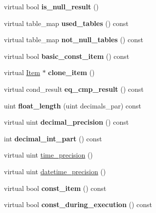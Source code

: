 \begin{DoxyCompactItemize}
virtual bool {\bfseries is\+\_\+null\+\_\+result} ()
\item 
\mbox{\label{classItem_a2e6f1d83258831b14cbbb9212dbd378f}} 
virtual table\+\_\+map {\bfseries used\+\_\+tables} () const
\item 
\mbox{\label{classItem_a91e91383b3287dc58a27a3bf73e13e29}} 
virtual table\+\_\+map {\bfseries not\+\_\+null\+\_\+tables} () const
\item 
\mbox{\label{classItem_ada4688a1a037bd0c37752a763efe350f}} 
virtual bool {\bfseries basic\+\_\+const\+\_\+item} () const
\item 
\mbox{\label{classItem_ad441e5a0412f3a464ccf0a75cd6ffd5c}} 
virtual \mbox{\hyperlink{classItem}{Item}} $\ast$ {\bfseries clone\+\_\+item} ()
\item 
\mbox{\label{classItem_aacb1156cd4d3dedc374e7464f07fef73}} 
virtual cond\+\_\+result {\bfseries eq\+\_\+cmp\+\_\+result} () const
\item 
\mbox{\label{classItem_a54a5915f10d0649231b9b7bfff87f29d}} 
uint {\bfseries float\+\_\+length} (uint decimals\+\_\+par) const
\item 
\mbox{\label{classItem_a48997bf065bfa474b8d791f066bceae7}} 
virtual uint {\bfseries decimal\+\_\+precision} () const
\item 
\mbox{\label{classItem_afd1b61959674e2a9c0082ccafba902fc}} 
int {\bfseries decimal\+\_\+int\+\_\+part} () const
\item 
virtual uint \mbox{\hyperlink{classItem_a7b3cc55ea7e3a429a6e8f0fbbba6e4ff}{time\+\_\+precision}} ()
\item 
virtual uint \mbox{\hyperlink{classItem_a7d01a73ce07ab1b1503c2de56668fdc1}{datetime\+\_\+precision}} ()
\item 
\mbox{\label{classItem_a9f45ab36bf6773a609c6c55e01386516}} 
virtual bool {\bfseries const\+\_\+item} () const
\item 
\mbox{\label{classItem_aa62cc2ad3e635a450afe4c3dc718973a}} 
virtual bool {\bfseries const\+\_\+during\+\_\+execution} () const

\end{DoxyCompactItemize}

